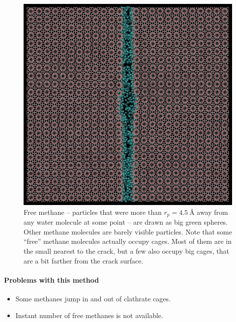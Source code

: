\begin{figure}
\includegraphics[width=\textwidth]{../pictures/free_methane.pdf}
\caption{Free methane -- particles that were more than $r_p = \SI{4.5}{\angstrom}$ away from any water molecule at some point -- are drawn as big green spheres. Other methane molecules are barely visible particles. Note that some ``free'' methane molecules actually occupy cages. Most of them are in the small nearest to the crack, but a few also occupy big cages, that are a bit farther from the crack surface. }
\label{fig:free_methane}
\end{figure}

\paragraph{Problems with this method}
\begin{itemize}
\item Some methanes jump in and out of clathrate cages. 
\item Instant number of free methanes is not available.
\end{itemize}

